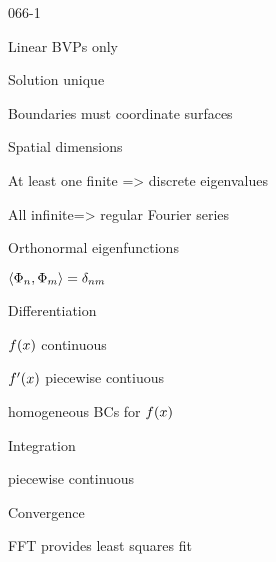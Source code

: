 \begin{mitframe}{066-1}
\begin{listone}
	\item Linear BVPs only
    	\begin{listtwo}
        	\item Solution unique
        \end{listtwo}
     \item Boundaries must coordinate surfaces
    \item Spatial dimensions
    	\item At least one finite => discrete eigenvalues
        \item All infinite=> regular Fourier series
    \item Orthonormal eigenfunctions
    	\begin{listtwo}
        	\item $\langle\pot_n,\pot_{\mass}\rangle=\blthick_{n\mass}$
        \end{listtwo}
    \item Differentiation
    	\begin{listtwo}
        	\item $\fug(\disp)$ continuous
            \item $\fug'(\disp)$ piecewise contiuous
            \item homogeneous BCs for $\fug(\disp)$
        \end{listtwo}
    \item Integration
    	\begin{listtwo}
        	\item piecewise continuous
        \end{listtwo}
    \item Convergence
    	\begin{listtwo}
        	\item FFT provides least squares fit
        \end{listtwo}
\end{listone}    
\end{mitframe}